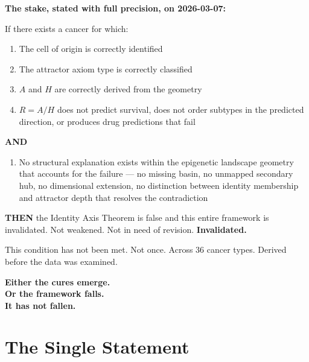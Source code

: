 \documentclass[11pt, a4paper]{article}
\begin{document}
\begin{mdframed}[backgroundcolor=stakebox,
                 linecolor=orange!60!black,
                 linewidth=2pt]
\textbf{The stake, stated with full precision, on
2026-03-07:}

\medskip
If there exists a cancer for which:

\begin{enumerate}[label=(\alph*)]
    \item The cell of origin is correctly identified
    \item The attractor axiom type is correctly classified
    \item $A$ and $H$ are correctly derived from the
    geometry
    \item $R = A/H$ does not predict survival, does not
    order subtypes in the predicted direction, or produces
    drug predictions that fail
\end{enumerate}

\medskip
\textbf{AND}

\medskip
\begin{enumerate}[label=(\alph*), resume]
    \item No structural explanation exists within the
    epigenetic landscape geometry that accounts for the
    failure --- no missing basin, no unmapped secondary
    hub, no dimensional extension, no distinction between
    identity membership and attractor depth that resolves
    the contradiction
\end{enumerate}

\medskip
\textbf{THEN} the Identity Axis Theorem is false and this
entire framework is invalidated. Not weakened. Not in need
of revision. \textbf{Invalidated.}

\medskip
This condition has not been met. Not once. Across 36
cancer types. Derived before the data was examined.

\medskip
\begin{center}
\large\textbf{Either the cures emerge.\\
Or the framework falls.\\[0.3em]
It has not fallen.}
\end{center}
\end{mdframed}

\section{The Single Statement}
\end{document}
